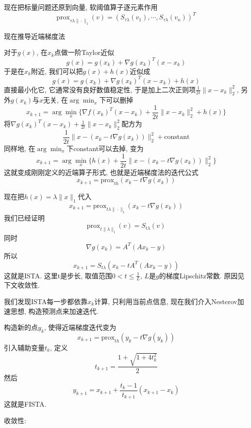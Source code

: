 \documentclass[UTF8]{ctexart}
\theoremstyle{definition}
\theoremstyle{examplestyle}
\theoremstyle{remark}
\begin{document}
现在把标量问题还原到向量, 软阈值算子逐元素作用
\[\text{prox}_{\tau\lambda\|\cdot\|_1}(v)=(S_{\tau\lambda}(v_1),\cdots,S_{\tau\lambda}(v_n))^T\]

现在推导近端梯度法

对于$g(x)$, 在$x_k$点做一阶Taylor近似
\[g(x)=g(x_k)+\nabla g(x_k)^T(x-x_k)\]
于是在$x_k$附近, 我们可以把$g(x)+h(x)$近似成
\[g(x)=g(x_k)+\nabla g(x_k)^T(x-x_k)+h(x)\]
直接最小化它, 它通常没有良好数值稳定性, 于是加上二次正则项$\frac{1}{2t}\|x-x_k\|_2^2$, 另外$g(x_k)$与$x$无关, 在$\arg\min_x$下可以删掉
\[x_{k+1}=\arg\min_x\{\nabla f(x_k)^T(x-x_k)+\frac{1}{2t}\|x-x_k\|_2^2+h(x)\}\]
将$\nabla g(x_k)^T(x-x_k)+\frac{1}{2t}\|x-x_k\|_2^2$配方为
\[\frac{1}{2t}\|x-(x_k-t\nabla g(x_k))\|_2^2+\text{constant}\]
同样地, 在$\arg\min_x$下constant可以去掉, 变为
\[x_{k+1}=\arg\min_x\{h(x)+\frac{1}{2t}\|x-(x_k-t\nabla g(x_k))\|_2^2\}\]
这就变成刚刚定义的近端算子形式, 也就是近端梯度法的迭代公式
\[x_{k+1}=\text{prox}_{th}(x_k-t\nabla g(x_k))\]

现在把$h(x)=\lambda\|x\|_1$代入
\[x_{k+1}=\text{prox}_{t\lambda\|\cdot\|_1}(x_k-t\nabla g(x_k))\]
我们已经证明
\[\text{prox}_{t\|\lambda\|_1}(v)=S_{t\lambda}(v)\]
同时
\[\nabla g(x_k)=A^T(Ax_k-y)\]
所以
\[x_{k+1}=S_{t\lambda}(x_k-tA^T(Ax_k-y))\]
这就是ISTA. 这里t是步长, 取值范围$0<t\le\frac{1}{L}$, $L$是$g$的梯度Lipschitz常数. 原因见下文收敛性.

我们发现ISTA每一步都依靠$x_k$计算, 只利用当前点信息, 现在我们介入Nesterov加速思想, 构造预测点来加速迭代.

构造新的点$y_k$, 使得近端梯度迭代变为
\[x_{k+1}=\text{prox}_{th}(y_k-t\nabla g(y_k))\]
引入辅助变量$t_k$, 定义
\[t_{k+1}=\frac{1+\sqrt{1+4t_k^2}}{2}\]
然后
\[y_{k+1}=x_{k+1}+\frac{t_k-1}{t_{k+1}}(x_{k+1}-x_k)\]
这就是FISTA.

收敛性:
\end{document}
